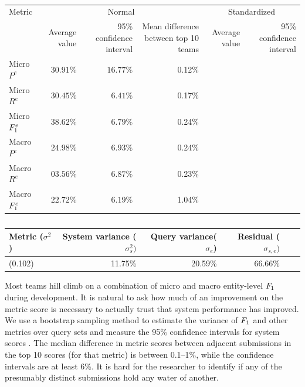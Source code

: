 \begin{table}
  \begin{tabular} {l r r r r r} \toprule
    Metric & \multicolumn{3}{c}{Normal} & \multicolumn{2}{c}{Standardized} \\
           & Average value & 95\% confidence interval & Mean difference between top 10 teams &  Average value & 95\% confidence interval  \\  \midrule 
Micro $P^e$     & $30.91\%$ &  $16.77\%$ & 0.12\% &     &  \\
Micro $R^e$     & $30.45\%$ &  $ 6.41\%$ & 0.17\% &     &  \\
Micro $F_1^e$ & $38.62\%$ &  $ 6.79\%$ & 0.24\% &     &  \\
Macro $P^e$     & $24.98\%$ &  $ 6.93\%$ & 0.24\% &     &  \\
Macro $R^e$     & $03.56\%$ &  $ 6.87\%$ & 0.23\% &     &  \\
Macro $F_1^e$ & $22.72\%$ &  $ 6.19\%$ & 1.04\% &     &  \\ \bottomrule
  \end{tabular}

\begin{tabular}{l r r r r r} \toprule
  Metric ($\sigma^2$) & System variance ($\sigma^2_{s}) $ & Query variance($\sigma_{e}$) & Residual ($\sigma_{s,e})$ \\ \midrule %
  \fone{} (0.102) & 11.75\% & 20.59\% & 66.66\% \\ \bottomrule %
\end{tabular}
  \caption{\label{metric-variance}}
\end{table}

Most teams hill climb on a combination of micro and macro entity-level $F_1$ during development.
It is natural to ask how much of an improvement on the metric score is necessary to actually trust that system performance has improved.
We use a bootstrap sampling method to estimate the variance of $F_1$ and other metrics over query sets  and measure the 95\% confidence intervals for system scores .
The median difference in metric scores between adjacent submissions in the top 10 scores (for that metric) is between 0.1--1\%,
while the confidence intervals are at least 6\%.
It is hard for the researcher to identify if any of the presumably distinct submissions hold any water of another.

